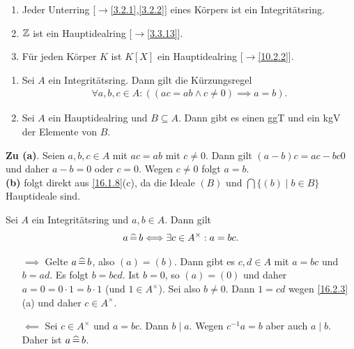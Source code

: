 \documentclass[../../main.tex]{subfiles}
\begin{document}
\begin{bsp}\label{16.2.2}
\begin{enumerate}[\normalfont(a)]
\item Jeder Unterring [$\to$\ref{3.2.1},\ref{3.2.2}] eines Körpers ist ein Integritätsring.
\item $\mathbb Z$ ist ein Hauptidealring [$\to$\ref{3.3.13}].
\item Für jeden Körper $K$ ist $K[X]$ ein Hauptidealring [$\to$\ref{10.2.2}].
\end{enumerate}
\end{bsp}

\begin{pro}\label{16.2.3}
\begin{enumerate}[\normalfont(a)]
\item Sei $A$ ein Integritätsring. Dann gilt die Kürzungsregel
\begin{align*}
\forall a,b,c\in A: ((ac=ab\land c\neq 0)\implies a=b).
\end{align*}
\item Sei $A$ ein Hauptidealring und $B\subseteq A$. Dann gibt es einen ggT und ein kgV der Elemente von $B$.
\end{enumerate}
\end{pro}
\begin{cproof}
\textbf{Zu (a)}. Seien $a,b,c\in A$ mit $ac=ab$ mit $c\neq 0$. Dann gilt $(a-b)c=ac-bc0$ und daher $a-b=0$ oder $c=0$. Wegen $c\neq 0$ folgt $a=b$.\\

\textbf{(b)} folgt direkt aus \ref{16.1.8}(c), da die Ideale $(B)$ und $\bigcap\{(b)\mid b\in B\}$ Hauptideale sind.
\end{cproof}

\begin{pro}\label{16.2.4}
Sei $A$ ein Integritätsring und $a,b\in A$. Dann gilt
\begin{align*}
a\,\widehat{=}\, b\Longleftrightarrow \exists c\in A^\times: a=bc.
\end{align*}
\end{pro}
\begin{cproof}
\begin{itemize}
\item[$\implies$] Gelte $a\,\widehat{=}\, b$, also $(a)=(b)$. Dann gibt es $c,d\in A$ mit $a=bc$ und $b=ad$. Es folgt $b=bcd$. Ist $b=0$, so $(a)=(0)$ und daher $a=0=0\cdot 1=b\cdot 1$ (und $1\in A^\times$). Sei also $b\neq 0$. Dann $1=cd$ wegen \ref{16.2.3}(a) und daher $c\in A^\times$.
\item[$\impliedby$] Sei $c\in A^\times$ und $a=bc$. Dann $b\mid a$. Wegen $c^{-1}a=b$ aber auch $a\mid b$. Daher ist $a\,\widehat{=}\, b$.
\end{itemize}
\end{cproof}
\end{document}
